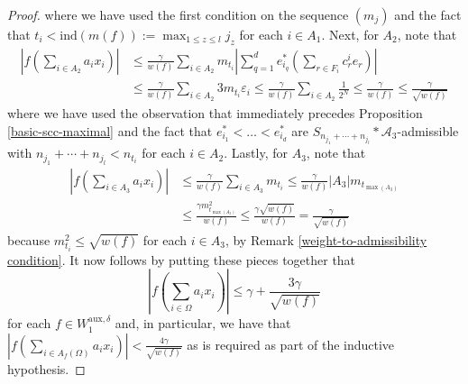 \documentclass[12pt,a4paper]{amsart}
\newcommand{\bes}{\begin{equation*}}
\newcommand{\ees}{\end{equation*}}
\newcommand{\ep}{\varepsilon}
\theoremstyle{definition}
\theoremstyle{plain}
\begin{document}
\begin{proof}
where we have used the first condition on the sequence $(m_{j})$ and the fact that $t_{i}<\text{ind}(m(f)):=\max_{1\leq z\leq l}j_{z}$ for each $i\in A_{1}$. Next, for $A_{2}$, note that
\begin{align*} \left\vert f\left(\sum_{i\in A_{2}}a_{i}x_{i}\right)\right\vert &\leq \frac{\gamma}{w(f)}\sum_{i\in A_{2}}m_{t_{i}}\left\vert\sum_{q=1}^{d}e^{*}_{i_{q}}\left(\sum_{r\in F_{i}}c^{i}_{r}e_{r}\right) \right\vert \\ &\leq \frac{\gamma}{w(f)}\sum_{i\in A_{2}} 3m_{t_{i}}\ep_{i} \leq\frac{\gamma}{w(f)}\sum_{i\in A_{2}}\frac{1}{2^{N}}\leq\frac{\gamma}{w(f)}\leq\frac{\gamma}{\sqrt{w(f)}} \end{align*}
where we have used the observation that immediately precedes Proposition \ref{basic-scc-maximal} and the fact that $e^{*}_{i_{1}}<\ldots<e^{*}_{i_{d}}$ are $S_{n_{j_{1}}+\cdots+n_{j_{l}}}\ast\mathcal{A}_{3}$-admissible with $n_{j_{1}}+\cdots+n_{j_{l}}<n_{t_{i}}$ for each $i\in A_{2}$. Lastly, for $A_{3}$, note that 
\begin{align*} \left\vert f\left(\sum_{i\in A_{3}}a_{i}x_{i}\right)\right\vert &\leq \frac{\gamma}{w(f)}\sum_{i\in A_{3}}m_{t_{i}} \leq \frac{\gamma}{w(f)}|A_{3}|m_{t_{\max(A_{3})}} \\ &\leq\frac{\gamma m^{2}_{t_{\max(A_{3})}}}{w(f)}\leq \frac{\gamma\sqrt{w(f)}}{w(f)}=\frac{\gamma}{\sqrt{w(f)}}\end{align*}
because $m_{t_{i}}^{2}\leq\sqrt{w(f)}$ for each $i\in A_{3}$, by Remark \ref{weight-to-admissibility condition}. It now follows by putting these pieces together that
\bes \left\vert f\left(\sum_{i\in\Omega}a_{i}x_{i}\right)\right\vert \leq \gamma+\frac{3\gamma}{\sqrt{w(f)}}\ees
for each $f\in W^{\text{aux},\delta}_{1}$ and, in particular, we have that $\left\vert f\left(\sum_{i\in A_{f}(\Omega)}a_{i}x_{i}\right)\right\vert < \frac{4\gamma}{\sqrt{w(f)}}$ as is required as part of the inductive hypothesis.


\end{proof}
\end{document}
